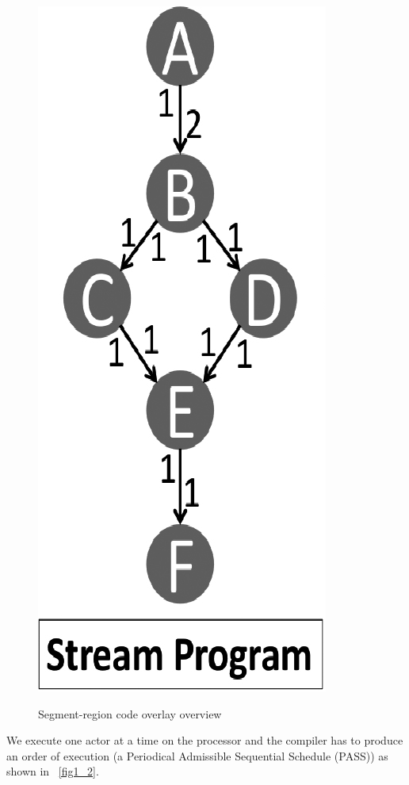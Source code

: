 \documentclass{article}
\begin{document}
\begin{figure}
\caption{Segment-region code overlay overview}
\centering
\includegraphics[scale=0.175]{fig2_1}
\label{fig2_1}
\end{figure}

We execute one actor at a time on the processor and the compiler has to produce an order of execution (a Periodical Admissible Sequential Schedule (PASS)) as shown in \figurename~\ref{fig1_2}.
\end{document}

